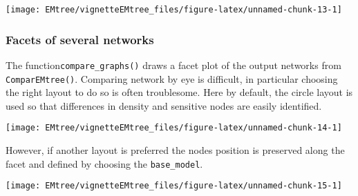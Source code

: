 \begin{center}\texttt{[image: EMtree/vignetteEMtree\_files/figure-latex/unnamed-chunk-13-1]} \end{center}

\subsubsection{Facets of several
networks}\label{facets-of-several-networks}

The function\texttt{compare\_graphs()} draws a facet plot of the output
networks from \texttt{ComparEMtree()}. Comparing network by eye is
difficult, in particular choosing the right layout to do so is often
troublesome. Here by default, the circle layout is used so that
differences in density and sensitive nodes are easily identified.

\begin{Shaded}
\begin{Highlighting}[]
\NormalTok{)}\OperatorTok{\$}
\end{Highlighting}
\end{Shaded}

\begin{center}\texttt{[image: EMtree/vignetteEMtree\_files/figure-latex/unnamed-chunk-14-1]} \end{center}

However, if another layout is preferred the nodes position is preserved
along the facet and defined by choosing the \texttt{base\_model}.

\begin{Shaded}
\begin{Highlighting}[]
\NormalTok{, }\NormalTok{, }\NormalTok{, }
\NormalTok{)}\OperatorTok{\$}
\end{Highlighting}
\end{Shaded}

\begin{center}\texttt{[image: EMtree/vignetteEMtree\_files/figure-latex/unnamed-chunk-15-1]} \end{center}

 